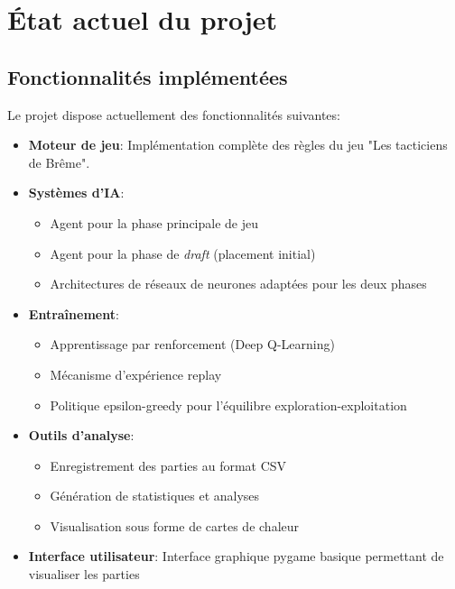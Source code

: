 \documentclass[]{article}
\begin{document}
\section{État actuel du projet}

\subsection{Fonctionnalités implémentées}

Le projet dispose actuellement des fonctionnalités suivantes:

\begin{itemize}
  \item \textbf{Moteur de jeu}: Implémentation complète des règles du jeu "Les tacticiens de Brême".

  \item \textbf{Systèmes d'IA}:
    \begin{itemize}
      \item Agent pour la phase principale de jeu
      \item Agent pour la phase de \emph{draft} (placement initial)
      \item Architectures de réseaux de neurones adaptées pour les deux phases
    \end{itemize}

  \item \textbf{Entraînement}:
    \begin{itemize}
      \item Apprentissage par renforcement (Deep Q-Learning)
      \item Mécanisme d'expérience replay
      \item Politique epsilon-greedy pour l'équilibre exploration-exploitation
    \end{itemize}

  \item \textbf{Outils d'analyse}:
    \begin{itemize}
      \item Enregistrement des parties au format CSV
      \item Génération de statistiques et analyses
      \item Visualisation sous forme de cartes de chaleur
    \end{itemize}

  \item \textbf{Interface utilisateur}: Interface graphique pygame basique permettant de visualiser les parties
\end{itemize}
\end{document}
